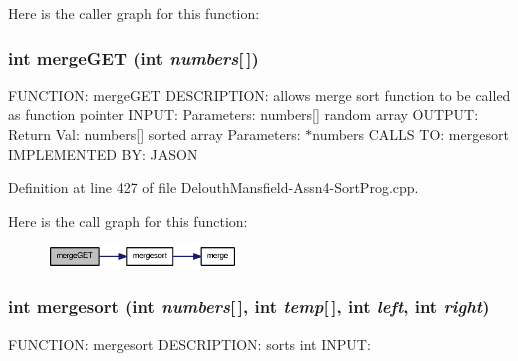 Here is the caller graph for this function:

\hypertarget{_delouth_mansfield-_assn4-_sort_prog_8cpp_a5bf887ba10188a54f08008fba4edd364}{
\subsubsection[{mergeGET}]{\setlength{\rightskip}{0pt plus 5cm}int mergeGET (int {\em numbers}\mbox{[}$\,$\mbox{]})}}
\label{_delouth_mansfield-_assn4-_sort_prog_8cpp_a5bf887ba10188a54f08008fba4edd364}
FUNCTION: mergeGET DESCRIPTION: allows merge sort function to be called as function pointer INPUT: Parameters: numbers\mbox{[}\mbox{]} random array OUTPUT: Return Val: numbers\mbox{[}\mbox{]} sorted array Parameters: $\ast$numbers CALLS TO: mergesort IMPLEMENTED BY: JASON 

Definition at line 427 of file DelouthMansfield-\/Assn4-\/SortProg.cpp.



Here is the call graph for this function:\nopagebreak
\begin{figure}[H]
\begin{center}
\leavevmode
\includegraphics[width=142pt]{_delouth_mansfield-_assn4-_sort_prog_8cpp_a5bf887ba10188a54f08008fba4edd364_cgraph}
\end{center}
\end{figure}


\hypertarget{_delouth_mansfield-_assn4-_sort_prog_8cpp_a5f5d9f539f726c766f4c454c579f2f6d}{
\subsubsection[{mergesort}]{\setlength{\rightskip}{0pt plus 5cm}int mergesort (int {\em numbers}\mbox{[}$\,$\mbox{]}, \/  int {\em temp}\mbox{[}$\,$\mbox{]}, \/  int {\em left}, \/  int {\em right})}}
\label{_delouth_mansfield-_assn4-_sort_prog_8cpp_a5f5d9f539f726c766f4c454c579f2f6d}
FUNCTION: mergesort DESCRIPTION: sorts int INPUT:

